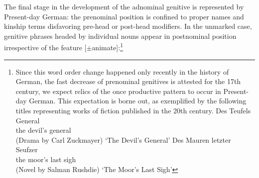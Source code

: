 \documentclass[output=paper
	        ,collection
	        ,collectionchapter
 	        ,biblatex
                ,babelshorthands
                ,newtxmath
                ,draftmode
                ,colorlinks, citecolor=brown
]{./langsci/langscibook}
\begin{document}
The final stage in the development of the adnominal genitive is represented by Present-day German: the prenominal position is confined to proper names and kinship terms disfavoring pre-head or post-head modifiers. In the unmarked case, genitive phrases headed by individual nouns appear in postnominal position irrespective of the feature [$\pm$animate]:\footnote{Since this word order change happened only recently in the history of German, \ie the fast decrease of prenominal genitives is attested for the 17th century, we expect relics of the once productive pattern to occur in Present-day German. This expectation is borne out, as exemplified by the following titles representing works of fiction published in the 20th century.
\eal
\ex
\gll Des Teufels General \\ the devil's general \\ \hfill (Drama by Carl Zuckmayer)
\glt `The Devil's General'
\ex
\gll Des Mauren letzter Seufzer \\ the moor's last sigh  \\ \hfill (Novel by Salman Rushdie)
\glt  `The Moor's Last Sigh'  
\zl
}

\eal
{}
\zl

\eal
{}
\zl
\end{document}
